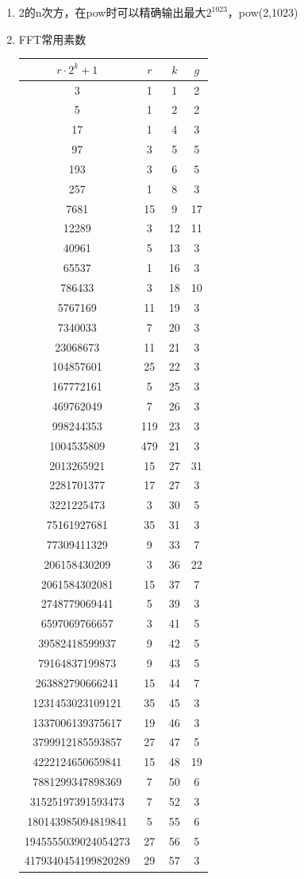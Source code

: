 \documentclass[twoside]{article}
\begin{document}
\begin{enumerate}
\item 2的n次方，在pow时可以精确输出最大$2^1023$，pow(2,1023)

\item FFT常用素数

\begin{tabular}{cccc}
    \hline
    $r⋅2^k+1$&$r$&$k$&$g$\\
    \hline
    3&1&1&2\\
    5&1&2&2\\
    17&1&4&3\\
    97&3&5&5\\
    193&3&6&5\\
    257&1&8&3\\
    7681&15&9&17\\
    12289&3&12&11\\
    40961&5&13&3\\
    65537&1&16&3\\
    786433&3&18&10\\
    5767169&11&19&3\\
    7340033&7&20&3\\
    23068673&11&21&3\\
    104857601&25&22&3\\
    167772161&5&25&3\\
    469762049&7&26&3\\
    998244353&119&23&3\\
    1004535809&479&21&3\\
    2013265921&15&27&31\\
    2281701377&17&27&3\\
    3221225473&3&30&5\\
    75161927681&35&31&3\\
    77309411329&9&33&7\\
    206158430209&3&36&22\\
    2061584302081&15&37&7\\
    2748779069441&5&39&3\\
    6597069766657&3&41&5\\
    39582418599937&9&42&5\\
    79164837199873&9&43&5\\
    263882790666241&15&44&7\\
    1231453023109121&35&45&3\\
    1337006139375617&19&46&3\\
    3799912185593857&27&47&5\\
    4222124650659841&15&48&19\\
    7881299347898369&7&50&6\\
    31525197391593473&7&52&3\\
    180143985094819841&5&55&6\\
    1945555039024054273&27&56&5\\
    4179340454199820289&29&57&3\\
    \hline
\end{tabular}

\end{enumerate}
\end{document}
